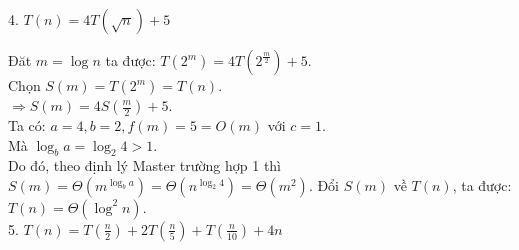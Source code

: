\documentclass[12pt, a4paper, fleqn]{article}
\begin{document}
		4. $T(n) = 4T\left( \sqrt{n} \right) + 5$
		
		Đăt $m = \log n$ ta được: $\displaystyle
		T(2 ^ m) = 4T\left(2 ^ {\frac{m}{2}}\right) + 5$.\\
		Chọn $S(m) = T(2 ^ m) = T(n)$.\\
		$\displaystyle
		\Rightarrow S(m) = 4S \left( \frac{m}{2} \right) + 5$.\\
		Ta có: $a = 4, b = 2, f(m) = 5 = O (m)$ với $c = 1$.\\
		Mà $\log_{b} a = \log_{2} 4 > 1$.\\
		Do đó, theo định lý Master trường hợp 1 thì $S(m) = \Theta \left( m^{\log_{b} a} \right) = \Theta (n^{\log_{2} 4}) = \Theta (m^2)$.
		Đổi $S(m)$ về $T(n)$, ta được: $T(n) = \Theta (\log^{2} n)$.
		\\
		
		5. $\displaystyle
		T(n) = T\left( \frac{n}{2} \right) + 2T\left( \frac{n}{5} \right) + T\left( \frac{n}{10} \right) + 4n$
\end{document}

